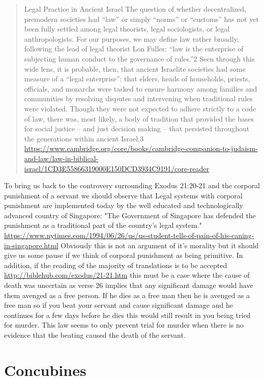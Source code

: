 \documentclass[11pt]{article}
\begin{document}
\begin{quote}
Legal Practice in Ancient Israel
The question of whether decentralized, premodern societies had “law” or simply “norms” or “customs” has not yet been fully settled among legal theorists, legal sociologists, or legal anthropologists. For our purposes, we may define law rather broadly, following the lead of legal theorist Lon Fuller: “law is the enterprise of subjecting human conduct to the governance of rules.”2 Seen through this wide lens, it is probable, then, that ancient Israelite societies had some measure of a “legal enterprise”: that elders, heads of households, priests, officials, and monarchs were tasked to ensure harmony among families and communities by resolving disputes and intervening when traditional rules were violated. Though they were not expected to adhere strictly to a code of law, there was, most likely, a body of tradition that provided the bases for social justice – and just decision making – that persisted throughout the generations within ancient Israel.3 \url{https://www.cambridge.org/core/books/cambridge-companion-to-judaism-and-law/law-in-biblical-israel/1CD3E55866319000E150DCD3934C9191/core-reader}
\end{quote} 

To bring us back to the controvery surrounding Exodus 21:20-21 and the corporal punishment of a servant we should observe that Legal systems with corporal punishment are implemented today by the well educated and technologically advanced country of Singapore: "The Government of Singapore has defended the punishment as a traditional part of the country's legal system." \url{https://www.nytimes.com/1994/06/26/us/us-student-tells-of-pain-of-his-caning-in-singapore.html} Obviously this is not an argument of it's morality but it should give us some pause if we think of corporal punishment as being primitive. In addition, if the reading of the majority of translations is to be accepted \url{http://biblehub.com/exodus/21-21.htm} this must be a case where the cause of death was uncertain as verse 26 implies that any significant damage would have them avenged as a free person. If he dies as a free man then he is avenged as a free man so if you beat your servant and cause significant damage and he continues for a few days before he dies this would still result in you being tried for murder. This law seems to only prevent trial for murder when there is no evidence that the beating caused the death of the servant.


\section{Concubines}
\end{document}
